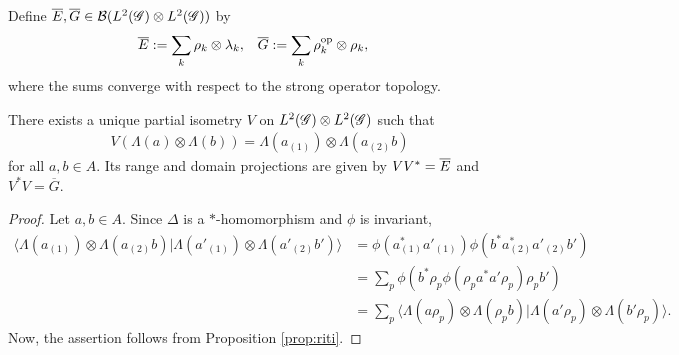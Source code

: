  Define $\overline{E},\overline{G} \in {\cal B}(L^{2}(\mathscr{G}) \otimes
L^{2}(\mathscr{G}))$ by
\begin{align*}
  \overline{E} &:=\sum_{k} \rho_{k} \otimes \lambda_{k}, & 
  \overline{G} &:= \sum_{k} \rho_{k}^{\operatorname{\mathrm{op}}} \otimes \rho_{k},
\end{align*}
where the sums converge with respect to the strong operator
topology.
\begin{Lem} \label{lemma:partial-isometry}
There exists a unique partial isometry $V$ on $L^{2}(\mathscr{G}) \otimes L^{2}(\mathscr{G})$
such that
\begin{align*}
  V(\Lambda(a) \otimes \Lambda(b)) = \Lambda(a_{(1)}) \otimes \Lambda(a_{(2)}b)
\end{align*}
for all $a,b\in A$. Its range and domain projections are given by $VV^{*} = \overline{E}$
and $V^{*}V = \overline{G}$.
\end{Lem}
\begin{proof}
  Let $a,b \in A$. Since $\Delta$ is a $*$-homomorphism and $\phi$ is
invariant,
  \begin{align*}
    \langle \Lambda(a_{(1)}) \otimes
    \Lambda(a_{(2)}b)|\Lambda(a'_{(1)}) \otimes
    \Lambda(a'_{(2)}b')\rangle &=
    \phi(a_{(1)}^{*}a'_{(1)})\phi(b^{*}a_{(2)}^{*}a'_{(2)}b') \\
    &= \sum_{p}
    \phi(b^{*}\rho_{p}\phi(\rho_{p}a^{*}a'\rho_{p})\rho_{p}b') \\
    & =\sum_{p} \langle\Lambda(a\rho_{p}) \otimes \Lambda(\rho_{p}b) |
    \Lambda(a'\rho_{p}) \otimes \Lambda(b'\rho_{p})\rangle.
  \end{align*}
  Now, the assertion follows from Proposition \ref{prop:riti}.
\end{proof}

